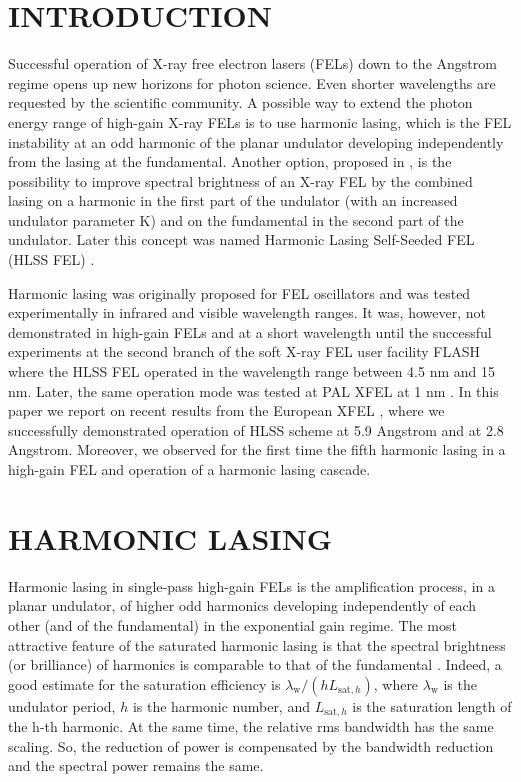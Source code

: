 \documentclass[aps,prl,preprint,groupedaddress,preprintnumbers]{revtex4}
\begin{document}
\section{INTRODUCTION}

Successful operation of X-ray free electron lasers (FELs)
down to the Angstrom regime opens up new horizons for photon science. Even shorter
wavelengths are requested by the scientific community.
A possible way to extend the photon energy range of high-gain X-ray FELs is to use harmonic
lasing, which is
the FEL instability at an odd harmonic of the
planar undulator \cite{murphy,hg-2,kim-1,mcneil,sy-harm} developing independently from the lasing at the fundamental.
Another option, proposed in \cite{sy-harm}, is the possibility to improve spectral brightness of an X-ray FEL by
the combined lasing on a harmonic in the first part of the undulator (with an increased undulator parameter K)
and on the fundamental in the second part of the undulator. Later this concept was named Harmonic Lasing Self-Seeded
FEL (HLSS FEL) \cite{hlss}.

Harmonic lasing was originally proposed for FEL oscillators \cite{colson} and was tested experimentally in infrared
and visible wavelength
ranges. It was, however, not demonstrated in high-gain FELs and at a short wavelength until the
successful experiments \cite{prab-hlss-fl2} at the second branch of the soft X-ray FEL user facility
FLASH \cite{flash,fl2-njp} where the HLSS FEL operated in the wavelength range between 4.5 nm and 15 nm. Later,
the same operation mode was tested at PAL XFEL at 1 nm \cite{pal-hlss}. In this paper we report on recent
results from the European XFEL \cite{winni-xfel}, where we successfully demonstrated
operation of HLSS scheme at 5.9 Angstrom and at 2.8 Angstrom. Moreover, we observed for the first time the fifth
harmonic lasing in a high-gain FEL and operation of a harmonic lasing cascade.


\section{HARMONIC LASING}

Harmonic lasing in single-pass high-gain FELs \cite{murphy,hg-2,kim-1,mcneil,sy-harm} is the
amplification process, in a planar undulator, of higher odd harmonics developing independently of each
other (and of the fundamental) in the exponential gain regime.
The most attractive feature of the saturated harmonic lasing
is that the spectral brightness (or brilliance)
of harmonics is comparable to that of the fundamental \cite{sy-harm}.
Indeed, a good estimate for the
saturation efficiency is $\lambda_{\mathrm{w}}/(h L_{\mathrm{sat},h})$, where $\lambda_{\mathrm{w}}$ is the
undulator period, $h$ is the harmonic number, and
$L_{\mathrm{sat},h}$ is the saturation length of the h-th harmonic.
At the same time, the relative rms bandwidth
has the same scaling. So, the reduction of power is compensated by the bandwidth reduction and the spectral
power remains the same.
\end{document}
